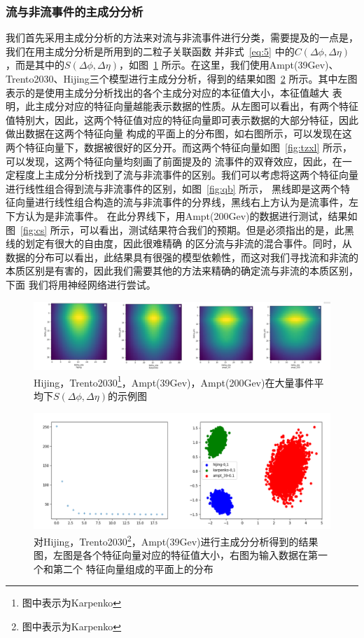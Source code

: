 \documentclass[aps,pre,12pt,preprint,onecolumn,showpacs,showkeys]{revtex4-1}
\begin{document}
\subsubsection{流与非流事件的主成分分析}
我们首先采用主成分分析的方法来对流与非流事件进行分类，需要提及的一点是，我们在用主成分分析是所用到的二粒子关联函数
并非式~\ref{eq:5} 中的$C(\Delta\phi,\Delta\eta)$，而是其中的$S(\Delta\phi,\Delta\eta)$，如图~\ref{fig:pcasample} 所示。在这里，我们使用Ampt(39Gev)、
Trento2030、Hijing三个模型进行主成分分析，得到的结果如图~\ref{fig:pcaresults} 所示。其中左图表示的是使用主成分分析找出的各个主成分对应的本征值大小，本征值越大
表明，此主成分对应的特征向量越能表示数据的性质。从左图可以看出，有两个特征值特别大，因此，这两个特征值对应的特征向量即可表示数据的大部分特征，因此做出数据在这两个特征向量
构成的平面上的分布图，如右图所示，可以发现在这两个特征向量下，数据被很好的区分开。而这两个特征向量如图~\ref{fig:tzxl} 所示，可以发现，这两个特征向量均刻画了前面提及的
流事件的双脊效应，因此，在一定程度上主成分分析找到了流与非流事件的区别。我们可以考虑将这两个特征向量进行线性组合得到流与非流事件的区别，如图~\ref{fig:qb} 所示，
黑线即是这两个特征向量进行线性组合构造的流与非流事件的分界线，黑线右上方认为是流事件，左下方认为是非流事件。
在此分界线下，用Ampt(200Gev)的数据进行测试，结果如图~\ref{fig:cs} 所示，可以看出，测试结果符合我们的预期。但是必须指出的是，此黑线的划定有很大的自由度，因此很难精确
的区分流与非流的混合事件。同时，从数据的分布可以看出，此结果具有很强的模型依赖性，而这对我们寻找流和非流的本质区别是有害的，因此我们需要其他的方法来精确的确定流与非流的本质区别，下面
我们将用神经网络进行尝试。
\begin{figure}[htbp]
\centering
\includegraphics[width=140mm]{pcasample}
\caption{\label{fig:pcasample}%
Hijing，Trento2030\footnote{图中表示为Karpenko}，Ampt(39Gev)，Ampt(200Gev)在大量事件平均下$S(\Delta\phi,\Delta\eta)$的示例图}
\end{figure}
\begin{figure}[htbp]
\centering
\includegraphics[width=140mm]{pcaresults}
\caption{\label{fig:pcaresults}%
对Hijing，Trento2030\footnote{图中表示为Karpenko}，Ampt(39Gev)进行主成分分析得到的结果图，左图是各个特征向量对应的特征值大小，右图为输入数据在第一个和第二个
特征向量组成的平面上的分布}
\end{figure}
\end{document}
